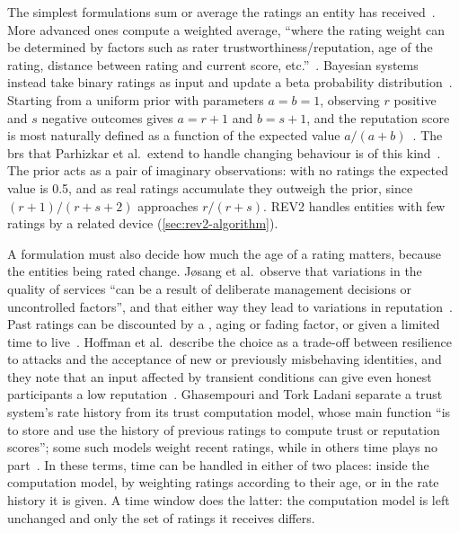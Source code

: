 The simplest formulations sum or average the ratings an entity has received~\cite[p.~628]{Jsang2007}. More advanced ones compute a weighted average, \enquote{where the rating weight can be determined by factors such as rater trustworthiness/reputation, age of the rating, distance between rating and current score, etc.}~\cite[p.~628]{Jsang2007}. Bayesian systems instead take binary ratings as input and update a beta probability distribution~\cite[p.~628]{Jsang2007}. Starting from a uniform prior with parameters $a = b = 1$, observing $r$ positive and $s$ negative outcomes gives $a = r + 1$ and $b = s + 1$, and the reputation score is most naturally defined as a function of the expected value $a/(a + b)$~\cite[p.~629]{Jsang2007}. The \gls{brs} that Parhizkar et al.\ extend to handle changing behaviour is of this kind~\cite[p.~2]{Parhizkar2022}. The prior acts as a pair of imaginary observations: with no ratings the expected value is 0.5, and as real ratings accumulate they outweigh the prior, since $(r + 1)/(r + s + 2)$ approaches $r/(r + s)$. REV2 handles entities with few ratings by a related device (\cref{sec:rev2-algorithm}).

A formulation must also decide how much the age of a rating matters, because the entities being rated change. Jøsang et al.\ observe that variations in the quality of services \enquote{can be a result of deliberate management decisions or uncontrolled factors}, and that either way they lead to variations in reputation~\cite[p.~639]{Jsang2007}. Past ratings can be discounted by a , aging or fading factor, or given a limited time to live~\cite[p.~639]{Jsang2007}. Hoffman et al.\ describe the choice as a trade-off between resilience to attacks and the acceptance of new or previously misbehaving identities, and they note that an input affected by transient conditions can give even honest participants a low reputation~\cite[p.~1:7]{Hoffman2009}. Ghasempouri and Tork Ladani separate a trust system's rate history from its trust computation model, whose main function \enquote{is to store and use the history of previous ratings to compute trust or reputation scores}; some such models weight recent ratings, while in others time plays no part~\cite[p.~578]{Ghasempouri2019}. In these terms, time can be handled in either of two places: inside the computation model, by weighting ratings according to their age, or in the rate history it is given. A time window does the latter: the computation model is left unchanged and only the set of ratings it receives differs.

